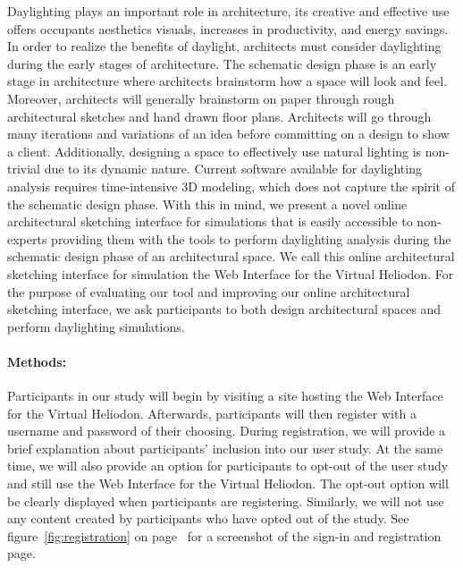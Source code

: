 \documentclass[12pt]{article}
\begin{document}
Daylighting plays an important role in architecture, its creative and effective use offers occupants aesthetics visuals, increases in productivity, and energy savings. 
In order to realize the benefits of daylight, architects must consider daylighting during the early stages of architecture.
The schematic design phase is an early stage in architecture where architects brainstorm how a space will look and feel. 
Moreover, architects will generally brainstorm on paper through rough architectural sketches and hand drawn floor plans.
Architects will go through many iterations and variations of an idea before committing on a design to show a client.
Additionally, designing a space to effectively use natural lighting is non-trivial  due to its dynamic nature. 
Current software available for daylighting analysis requires time-intensive 3D modeling, which does not capture the spirit of the schematic design phase.
With this in mind, we present a novel online architectural sketching interface for simulations that is easily accessible to non-experts providing them with the tools to perform daylighting analysis during the schematic design phase of an architectural space.
We call this online architectural sketching interface for simulation the Web Interface for the Virtual Heliodon.
For the purpose of evaluating our tool and improving our online architectural sketching interface, we ask participants to both design architectural spaces and perform daylighting simulations.


\paragraph{Methods:}
%
Participants in our study will begin by visiting a site hosting the Web Interface for the Virtual Heliodon. 
Afterwards, participants will then register with a username and password of their choosing.
During registration, we will provide a brief explanation about participants' inclusion into our user study.
At the same time, we will also provide an option for participants to opt-out of the user study and still use the Web Interface for the Virtual Heliodon. 
The opt-out option will be clearly displayed when participants are registering. 
Similarly, we will not use any content created by participants who have opted out of the study.
See figure~\ref{fig:registration} on page~\pageref{fig:registration} for a screenshot of the sign-in and registration page. \\
\end{document}
